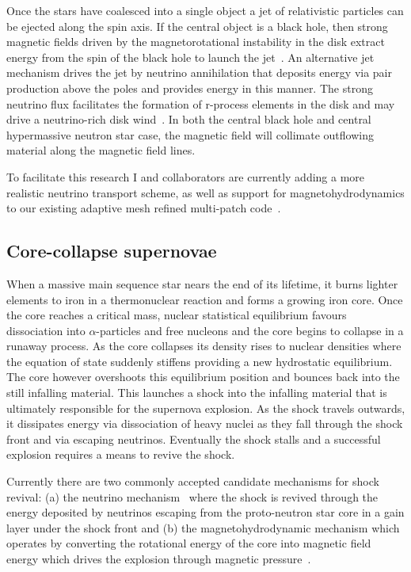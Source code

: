 \documentclass[12pt]{article}
\begin{document}
Once the stars have coalesced into a single object a jet of
relativistic particles can be ejected along the spin axis.
If the central object is a black hole, then strong magnetic fields
driven by the magnetorotational instability in
the disk extract energy from the spin of the black hole to launch the
jet~\cite{Blandford1977}.
An alternative jet mechanism drives the jet by neutrino annihilation that
deposits energy via pair production above the poles and
provides energy in this manner. The strong neutrino flux
facilitates the formation of r-process elements in the disk and may
drive a neutrino-rich disk wind~\cite{1999ApJ...525L.121F,Roberts:2010wh}.
In both the central black hole and central hypermassive
neutron star case, the magnetic field will collimate outflowing
material along the magnetic field lines.

To facilitate this research I and collaborators are currently adding a more
realistic neutrino
transport scheme, as well as support for magnetohydrodynamics to our existing
adaptive mesh refined multi-patch code~\cite{all:mpmhdnu}.  

\subsection{Core-collapse supernovae}
When a massive main sequence star nears the end of its lifetime, it burns
lighter elements to iron in a thermonuclear reaction and forms a growing 
iron core. Once the core reaches
a critical mass, nuclear statistical equilibrium favours dissociation into
$\alpha$-particles and free nucleons and the core begins to collapse in a
runaway process.
As the core collapses its density rises to nuclear densities where the
equation of state suddenly stiffens providing a new hydrostatic equilibrium.
The core however overshoots this equilibrium position and bounces back into
the still infalling material. This launches a shock into the infalling
material that is ultimately responsible for the supernova
explosion. As the shock travels outwards, it dissipates energy via
dissociation of heavy nuclei as they fall through the shock front and
via escaping neutrinos. Eventually
the shock stalls and a successful explosion requires a means to revive the
shock. 

Currently there are two commonly accepted candidate mechanisms for shock revival:
(a) the neutrino mechanism~\cite{1985nuas.conf..422W} %
where the shock is revived through the energy deposited by
neutrinos escaping from the proto-neutron star core in a gain layer under the
shock front and (b) the magnetohydrodynamic mechanism which operates by
converting the rotational energy of the core into magnetic field energy which
drives the explosion through magnetic
pressure~\cite{Janka:2012wk,Burrows:07b}.
\end{document}
